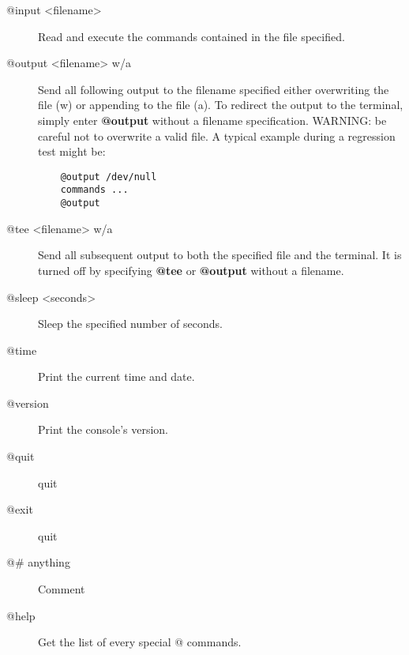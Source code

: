 \begin{description}

\item [@input {\textless}filename{\textgreater}]
   Read and execute the commands  contained in the file specified.

\item [@output {\textless}filename{\textgreater} w/a]
   Send all following output to the  filename specified either overwriting the
file (w) or appending to  the file (a). To redirect the output to the
terminal, simply enter  {\bf @output} without a filename specification.
WARNING: be careful  not to overwrite a valid file. A typical example during a
regression  test might be:

\footnotesize
\begin{verbatim}
    @output /dev/null
    commands ...
    @output

\end{verbatim}
\normalsize

\item [@tee {\textless}filename{\textgreater} w/a]
   Send all subsequent output to  both the specified file and the terminal. It is
   turned off by  specifying {\bf @tee} or {\bf @output} without a filename.

\item [@sleep {\textless}seconds{\textgreater}]
   Sleep the specified number of seconds.

\item [@time]
   Print the current time and date.

\item [@version]
   Print the console's version.

\item [@quit]
   quit

\item [@exit]
   quit

\item [@\# anything]
   Comment

\item [@help]
   Get the list of every special @ commands.


\end{description}

